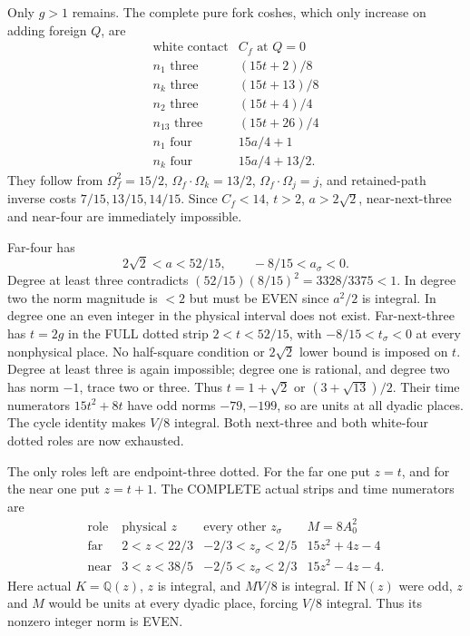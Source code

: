 \documentclass[11pt]{article}
\begin{document}
Only \(g>1\) remains.
The complete pure fork coshes, which only increase
on adding foreign \(Q\), are
\[
\begin{array}{c|c}
 \text{white contact}&C_f\text{ at }Q=0\\ \hline
 n_1\text{ three}&(15t+2)/8\\
 n_k\text{ three}&(15t+13)/8\\
 n_2\text{ three}&(15t+4)/4\\
 n_{13}\text{ three}&(15t+26)/4\\
 n_1\text{ four}&15a/4+1\\
 n_k\text{ four}&15a/4+13/2 .
\end{array}
\]
They follow from
\(\Omega_f^2=15/2\),
\(\Omega_f\cdot\Omega_k=13/2\),
\(\Omega_f\cdot\Omega_j=j\),
and retained-path inverse costs
\(7/15,13/15,14/15\).
Since \(C_f<14\), \(t>2\), \(a>2\sqrt2\),
near-next-three and near-four are immediately impossible.

Far-four has
\[
            2\sqrt2<a<52/15,\qquad -8/15<a_\sigma<0.
\]
Degree at least three contradicts
\((52/15)(8/15)^2=3328/3375<1\).
In degree two the norm magnitude is \(<2\)
but must be EVEN since \(a^2/2\) is integral.
In degree one an even integer in the physical
interval does not exist.
Far-next-three has \(t=2g\) in the FULL dotted strip
\(2<t<52/15\), with \(-8/15<t_\sigma<0\)
at every nonphysical place.
No half-square condition or \(2\sqrt2\) lower bound
is imposed on \(t\).
Degree at least three is again impossible;
degree one is rational, and degree two has norm
\(-1\), trace two or three.
Thus \(t=1+\sqrt2\) or \((3+\sqrt{13})/2\).
Their time numerators \(15t^2+8t\) have odd norms
\(-79,-199\), so are units at all dyadic places.
The cycle identity makes \(V/8\) integral.
Both next-three and both white-four dotted roles
are now exhausted.

The only roles left are endpoint-three dotted.
For the far one put \(z=t\), and for the near one
put \(z=t+1\).
The COMPLETE actual strips and time numerators are
\[
\begin{array}{c|c|c|c}
 \text{role}&\text{physical }z&\text{every other }z_\sigma&M=8A_0^2\\ \hline
 \text{far}&2<z<22/3&-2/3<z_\sigma<2/5&15z^2+4z-4\\
 \text{near}&3<z<38/5&-2/5<z_\sigma<2/3&15z^2-4z-4 .
\end{array}
\]
Here actual \(K=\mathbb Q(z)\), \(z\) is integral,
and \(MV/8\) is integral.
If \(\mathrm N(z)\) were odd, \(z\) and \(M\)
would be units at every dyadic place, forcing
\(V/8\) integral.
Thus its nonzero integer norm is EVEN.
\end{document}
